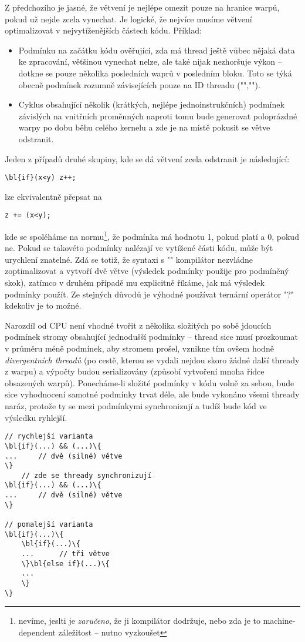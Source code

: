         Z předchozího je jasné, že větvení je nejlépe omezit pouze na hranice warpů, pokud už nejde zcela vynechat. Je logické, že nejvíce musíme větvení optimalizovat v nejvytíženějších částech kódu. Příklad:
        \begin{itemize}
        \item Podmínku na začátku kódu ověřující, zda má thread ještě vůbec nějaká data ke zpracování, většinou vynechat nelze, ale také nijak nezhoršuje výkon -- dotkne se pouze několika posledních waprů v posledním bloku. Toto se týká obecně podmínek rozumně závisejících pouze na ID threadu (\Vr"",\Vr"").
        \item Cyklus obsahující několik (krátkých, nejlépe jednoinstrukčních) podmínek závislých na vnitřních proměnných naproti tomu bude generovat poloprázdné warpy po dobu běhu celého kernelu a zde je na místě pokusit se větve odstranit.
        \end{itemize}
        Jeden z případů druhé skupiny, kde se dá větvení zcela odstranit je následující:
        \begin{Verbatim}[commandchars = \\\{\}]
\bl{if}(x<y) z++;
        \end{Verbatim}
        lze ekvivalentně přepsat na
        \begin{Verbatim}[commandchars = \\\{\}]
z += (x<y);
        \end{Verbatim}
        kde se spoléháme na normu\footnote{nevíme, jeslti je \emph{zaručeno}, že ji kompilátor dodržuje, nebo zda je to machine-dependent záležitost -- nutno vyzkoušet}, že podmínka má hodnotu 1, pokud platí a 0, pokud ne. Pokud se takovéto podmínky nalézají ve vytížené části kódu, může být urychlení znatelné. Zdá se totiž, že syntaxi s \Vr"" kompilátor nezvládne zoptimalizovat a vytvoří dvě větve (výsledek podmínky použije pro podmíněný skok), zatímco v druhém případě mu explicitně říkáme, jak má výsledek podmínky použít. Ze stejných důvodů je výhodné používat ternární operátor \Vr"?" kdekoliv je to možné.

        Narozdíl od CPU není vhodné tvořit z několika složitých po sobě jdoucích podmínek stromy obsahující jednodušší podmínky -- thread sice musí prozkoumat v průměru méně podmínek, aby stromem prošel, vznikne tím ovšem hodně \emph{divergentních threadů} (po cestě, kterou se vydali nejdou skoro žádné další thready z warpu) a výpočty budou serializovány (způsobí vytvoření mnoha řídce obsazených warpů). Ponecháme-li složité podmínky v kódu volně za sebou, bude sice vyhodnocení samotné podmínky trvat déle, ale bude vykonáno všemi thready naráz, protože ty se mezi podmínkymi synchronizují a tudíž bude kód ve výsledku ryhlejší.
        \begin{Verbatim}[commandchars = \\\{\}]
// rychlejší varianta
\bl{if}(...) && (...)\{
...     // dvě (silné) větve
\}
    // zde se thready synchronizují
\bl{if}(...) && (...)\{
...     // dvě (silné) větve
\}

// pomalejší varianta
\bl{if}(...)\{
    \bl{if}(...)\{
    ...      // tři větve
    \}\bl{else if}(...)\{
    ...
    \}
\}
        \end{Verbatim}

